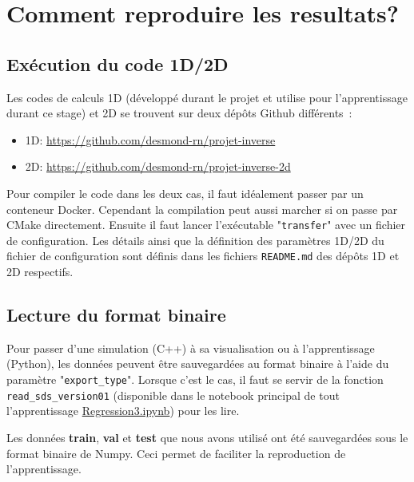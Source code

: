 

\chapter{Comment reproduire les resultats?} %

\label{AppendixA} %

\section{Exécution du code 1D/2D}

Les codes de calculs 1D (développé durant le projet et utilise pour l'apprentissage durant ce stage) et 2D se trouvent sur deux dépôts Github différents :
\begin{itemize}
 \item 1D: \url{https://github.com/desmond-rn/projet-inverse} 
 \item 2D: \url{https://github.com/desmond-rn/projet-inverse-2d}
\end{itemize}

Pour compiler le code dans les deux cas, il faut idéalement passer par un conteneur Docker. Cependant la compilation peut aussi marcher si on passe par CMake directement.
Ensuite il faut lancer l'exécutable "\verb|transfer|" avec un fichier de configuration. Les détails ainsi que la définition des paramètres 1D/2D du fichier de configuration sont définis dans les fichiers \verb|README.md| des dépôts 1D et 2D respectifs.

\section{Lecture du format binaire}
Pour passer d'une simulation (C++) à sa visualisation ou à l'apprentissage (Python), les données peuvent être sauvegardées au format binaire à l'aide du paramètre "\verb|export_type|". Lorsque c'est le cas, il faut se servir de la fonction \verb|read_sds_version01| (disponible dans le notebook principal de tout l'apprentissage \href{https://colab.research.google.com/drive/18oCXoZzY0_7XnEmHBzHH40vVVnIacoVc?usp=sharing}{Regression3.ipynb}) pour les lire.

Les données \textbf{train}, \textbf{val} et \textbf{test} que nous avons utilisé ont été sauvegardées sous le format binaire de Numpy. Ceci permet de faciliter la reproduction de l'apprentissage.



